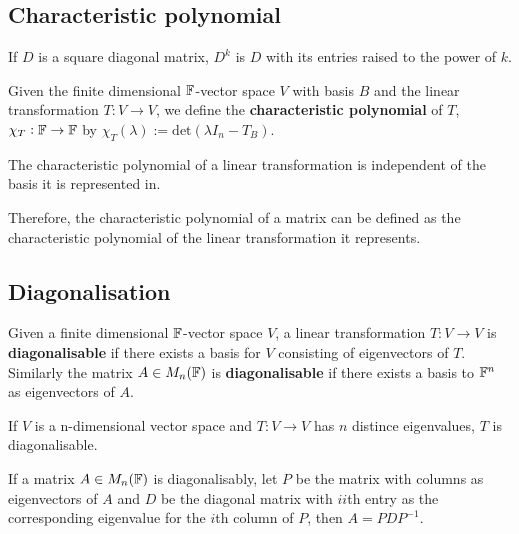 \documentclass[../Year1/Year1.tex]{subfiles}
\begin{document}
\subsection{Characteristic polynomial}

\begin{theorem}
    If $D$ is a square diagonal matrix, $D^k$ is $D$ with its entries raised to the power of $k$.
\end{theorem}

\begin{definition}
    Given the finite dimensional $\mathbb{F}$-vector space $V$ with basis $B$ and the linear transformation $T:V\rightarrow V$, we define the \textbf{characteristic polynomial} of $T$, $\chi_T:\mathbb{F}\rightarrow\mathbb{F}$ by $\chi_T(\lambda):= \text{det}(\lambda I_n-T_B)$.
\end{definition}

\begin{theorem}
    The characteristic polynomial of a linear transformation is independent of the basis it is represented in.
\end{theorem}

\begin{remark}
    Therefore, the characteristic polynomial of a matrix can be defined as the characteristic polynomial of the linear transformation it represents.
\end{remark}

\subsection{Diagonalisation}
\begin{definition}[Diagonalisability]
    Given a finite dimensional $\mathbb{F}$-vector space $V$, a linear transformation $T:V\rightarrow V$ is \textbf{diagonalisable} if there exists a basis for $V$ consisting of eigenvectors of $T$. Similarly the matrix $A\in M_n(\mathbb{F})$ is \textbf{diagonalisable} if there exists a basis to $\mathbb{F}^n$ as eigenvectors of $A$.
\end{definition}

\begin{theorem}
    If $V$ is a n-dimensional vector space and $T:V\rightarrow V$ has $n$ distince eigenvalues, $T$ is diagonalisable.
\end{theorem}

\begin{theorem}
    If a matrix $A\in M_n(\mathbb{F})$ is diagonalisably,  let $P$ be the matrix with columns as eigenvectors of $A$ and $D$ be the diagonal matrix with $ii$th entry as the corresponding eigenvalue for the $i$th column of $P$, then $A=PDP^{-1}$.
\end{theorem}
\end{document}
